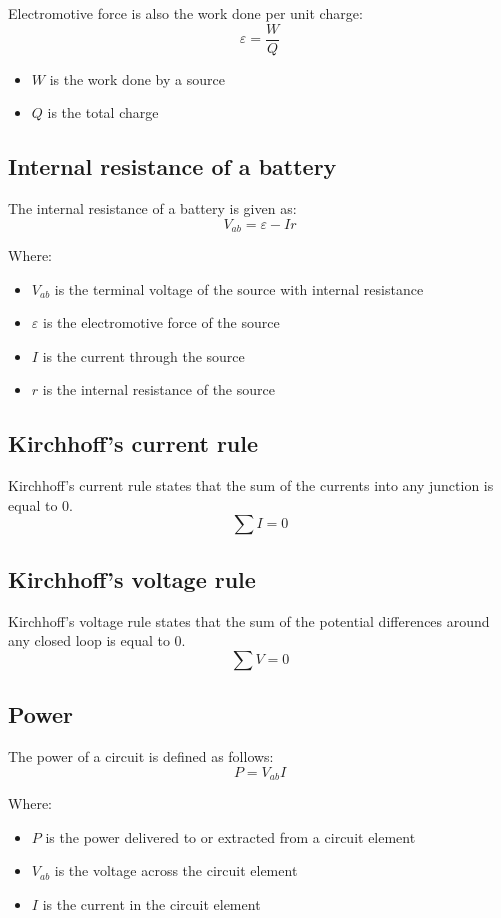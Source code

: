 \documentclass[11pt]{article}
\begin{document}
Electromotive force is also the work done per unit charge:
\[\varepsilon = \frac{W}{Q}\]

\begin{itemize}
\item \(W\) is the work done by a source
\item \(Q\) is the total charge
\end{itemize}

\subsection{Internal resistance of a battery}
\label{sec:org85ae169}
The internal resistance of a battery is given as:
\[V_{ab} = \varepsilon - Ir\]

Where:
\begin{itemize}
\item \(V_{ab}\) is the terminal voltage of the source with internal resistance
\item \(\varepsilon\) is the electromotive force of the source
\item \(I\) is the current through the source
\item \(r\) is the internal resistance of the source
\end{itemize}

\subsection{Kirchhoff's current rule}
\label{sec:org8412b02}
Kirchhoff's current rule states that the sum of the currents into any junction is equal to 0.
\[\sum I = 0\]

\subsection{Kirchhoff's voltage rule}
\label{sec:org4c4e845}
Kirchhoff's voltage rule states that the sum of the potential differences around any closed loop is equal to 0.
\[\sum V = 0\]

\newpage

\subsection{Power}
\label{sec:orgcb8b943}
The power of a circuit is defined as follows:
\[P = V_{ab} I\]

Where:
\begin{itemize}
\item \(P\) is the power delivered to or extracted from a circuit element
\item \(V_{ab}\) is the voltage across the circuit element
\item \(I\) is the current in the circuit element
\end{itemize}
\end{document}
